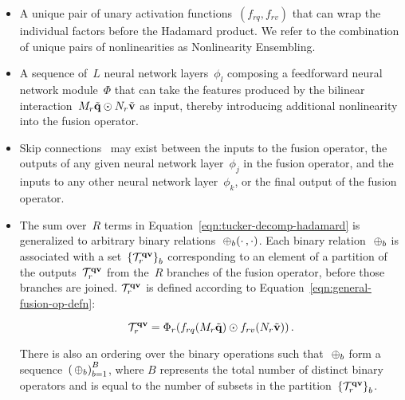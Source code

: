 \begin{itemize}
        \item A unique pair of unary activation
                functions~$(f_{rq}, f_{rv})$ that can wrap the individual
                factors before the Hadamard product. We refer to the
                combination of unique pairs of nonlinearities as Nonlinearity
                Ensembling.

        \item A sequence of~$L$ neural network layers~$\phi_l$ composing a
                feedforward neural network module~$\Phi$ that can take the features
                produced by the bilinear
                interaction~$M_r \tilde{\mathbf{q}} \odot N_r \tilde{\mathbf{v}}$ as
                input, thereby introducing additional nonlinearity into the
                fusion operator.

        \item Skip connections~\cite{he2016deep, srivastava2015training} may
                exist between the inputs to the fusion operator, the outputs of
                any given neural network layer~$\phi_j$ in the fusion operator,
                and the inputs to any other neural network layer~$\phi_k$, or
                the final output of the fusion operator.

        \item The sum over~$R$ terms in
                Equation~\ref{eqn:tucker-decomp-hadamard} is generalized to
                arbitrary binary relations~$\binopb(\cdot \,, \cdot)$. Each
                binary relation~$\binopb$ is associated with a
                set~${\{\mathcal{T}_r^{\mathbf{q}{}\mathbf{v}{}}\}}_b$ corresponding to an element of a
                partition of the outputs~$\mathcal{T}_r^{\mathbf{q}{}\mathbf{v}{}}$ from the~$R$ branches of
                the fusion operator, before those branches are joined.
                $\mathcal{T}_r^{\mathbf{q}{}\mathbf{v}{}}$ is defined according to
                Equation~\ref{eqn:general-fusion-op-defn}:

                \begin{equation}
                \mathcal{T}_r^{\mathbf{q}{}\mathbf{v}{}} =
                \Phi_r(f_{rq}{\left(M_r \tilde{\mathbf{q}}\right)} \odot f_{rv}{\left(N_r \tilde{\mathbf{v}}\right)}) \,.
                \label{eqn:general-fusion-op-defn}
                \end{equation}

                There is also an ordering over the binary operations such
                that~$\binopb$ form a sequence~$\binopseq$, where $B$
                represents the total number of distinct binary operators and is
                equal to the number of subsets in the
                partition~${\{\mathcal{T}_r^{\mathbf{q}{}\mathbf{v}{}}\}}_b$.


\end{itemize}
